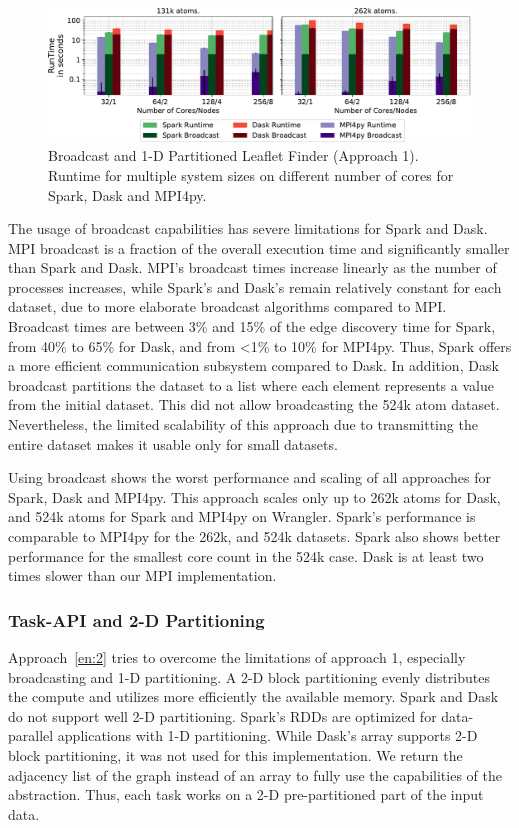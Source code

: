 \begin{figure}[t]
    \centering
    \includegraphics[width=.75\textwidth]{figures/data_analytics_hpc/task_par/spark_dask_lf_approach1.pdf}
    \caption{Broadcast and 1-D Partitioned Leaflet Finder (Approach 1). Runtime
    for multiple system sizes on different number of cores for Spark, Dask and
    MPI4py.}
    \label{fig:WranglerLeafLetFinderApp1}
\end{figure}

The usage of broadcast capabilities has severe limitations for Spark and Dask.
MPI broadcast is a fraction of the overall execution time and significantly
smaller than Spark and Dask. MPI's broadcast times increase linearly as the
number of processes increases, while Spark's and Dask's remain relatively
constant for each dataset, due to more elaborate broadcast algorithms compared
to MPI. Broadcast times are between 3\% and 15\% of the edge discovery time
for Spark, from 40\% to 65\% for Dask, and from <1\% to 10\% for MPI4py.
Thus, Spark offers a more efficient communication subsystem compared to Dask. In
addition, Dask broadcast partitions the dataset to a list where each element
represents a value from the initial dataset. This did not allow broadcasting the
524k atom dataset. Nevertheless, the limited scalability of this approach due
to transmitting the entire dataset makes it usable only for small datasets.

Using broadcast shows the worst performance and scaling of all approaches for
Spark, Dask and MPI4py. This approach scales only up to 262k atoms for Dask,
and 524k atoms for Spark and MPI4py on Wrangler. Spark's performance is
comparable to MPI4py for the 262k, and 524k datasets. Spark
also shows better performance
for the smallest core count in the 524k case. Dask is at least two times
slower than our MPI implementation.

\subsubsection*{Task-API and 2-D Partitioning}

Approach~\ref{en:2} tries to overcome the limitations of approach 1, especially
broadcasting and 1-D partitioning. A 2-D block partitioning evenly distributes
the compute and utilizes  more efficiently the available memory.
Spark and Dask do not support well 2-D partitioning. Spark's RDDs
are optimized for data-parallel applications with 1-D partitioning. While Dask's
array supports 2-D block partitioning, it was not used for this implementation.
We return the adjacency list of the graph instead of an array to fully use the
capabilities of the abstraction. Thus, each task works on a 2-D pre-partitioned
part of the input data.


